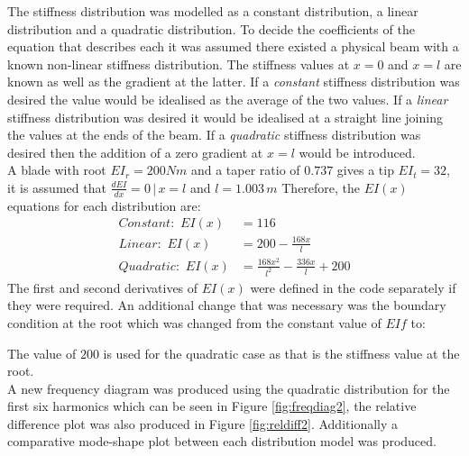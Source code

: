 \documentclass[11pt]{article}
\newcommand*{\lstconsolas}{\fontfamily{Consolas}\selectfont}
\begin{document}
The stiffness distribution was modelled as a constant distribution, a linear distribution and a quadratic distribution. To decide the coefficients of the equation that describes each it was assumed there existed a physical beam with a known non-linear stiffness distribution. The stiffness values at $x=0$ and $x=l$ are known as well as the gradient at the latter.
If a \textit{constant} stiffness distribution was desired the value would be idealised as the average of the two values. If a \textit{linear} stiffness distribution was desired it would be idealised at a straight line joining the values at the ends of the beam. If a \textit{quadratic} stiffness distribution was desired then the addition of a zero gradient at $x=l$ would be introduced.\\
A blade with root $EI_r=200Nm$ and a taper ratio of $0.737$ gives a tip $EI_t=32$, it is assumed that $\frac{dEI}{dx}=0\,|\,x=l$ and $l=1.003\,m$
Therefore, the $EI(x)$ equations for each distribution are:
\begin{align}
    Constant: \,\,EI(x)&=116\\
  Linear:\,\,  EI(x)&=200-\frac{168x}{l}\\
  Quadratic:\,\, EI(x)&=\frac{168x^{2}}{l^{2}}-\frac{336x}{l}+200
\end{align}{}
The first and second derivatives of $EI(x)$ were defined in the code separately if they were required. An additional change that was necessary was the boundary condition at the root which was changed from the constant value of $EIf$ to:

The value of $200$ is used for the quadratic case as that is the stiffness value at the root.\\
A new frequency diagram was produced using the quadratic distribution for the first six harmonics which can be seen in Figure \ref{fig:freqdiag2}, the relative difference plot was also produced in Figure \ref{fig:reldiff2}.
Additionally a comparative mode-shape plot between each distribution model was produced.
\end{document}
